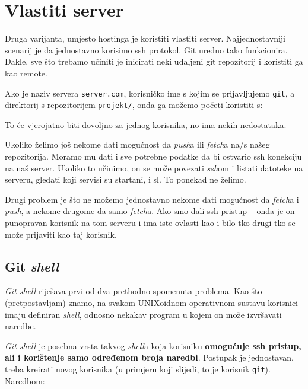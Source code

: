\section*{Vlastiti server}

Druga varijanta, umjesto hostinga je koristiti vlastiti server.
Najjednostavniji scenarij je da jednostavno korisimo ssh protokol. 
Git uredno tako funkcionira.
Dakle, sve što trebamo učiniti je inicirati neki udaljeni git repozitorij i koristiti ga kao remote.

Ako je naziv servera \verb+server.com+, korisničko ime s kojim se prijavljujemo \verb+git+, a direktorij s repozitorijem \verb+projekt/+, onda ga možemo početi koristiti s:


To će vjerojatno biti dovoljno za jednog korisnika, no ima nekih nedostataka.

Ukoliko želimo još nekome dati mogućnost da \emph{push}a ili \emph{fetch}a na/s našeg repozitorija. 
Moramo mu dati i sve potrebne podatke da bi ostvario ssh konekciju na naš server.
Ukoliko to učinimo, on se može povezati \emph{ssh}om i listati datoteke na serveru, gledati koji servisi su startani, i sl.
To ponekad ne želimo.

Drugi problem je što ne možemo jednostavno nekome dati mogućnost da \emph{fetch}a i \emph{push}, a nekome drugome da samo \emph{fetch}a.
Ako smo dali ssh pristup -- onda je on punopravan korisnik na tom serveru i ima iste ovlasti kao i bilo tko drugi tko se može prijaviti kao taj korisnik.

\subsection*{Git \emph{shell}}

\emph{Git shell} riješava prvi od dva prethodno spomenuta problema. 
Kao što (pretpostavljam) znamo, na svakom UNIXoidnom operativnom sustavu korisnici imaju definiran \emph{shell}, odnosno nekakav program u kojem on može izvršavati naredbe.

\emph{Git shell} je posebna vrsta takvog \emph{shell}a koja korisniku \textbf{omogućuje ssh pristup, ali i korištenje samo određenom broja naredbi}.
Postupak je jednostavan, treba kreirati novog korisnika (u primjeru koji slijedi, to je korisnik \verb+git+).
Naredbom:

